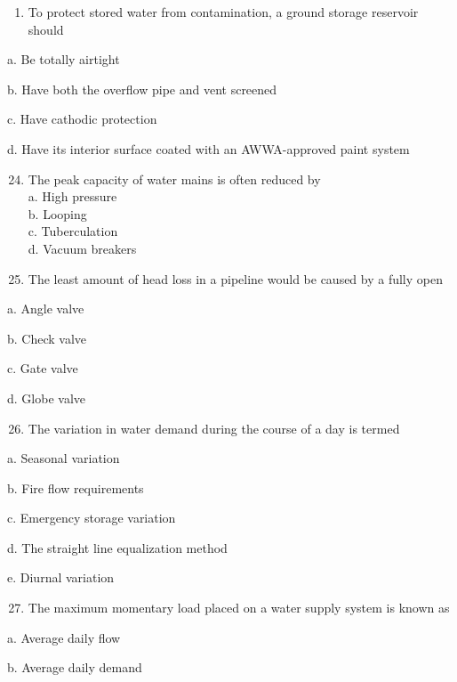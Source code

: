 \documentclass[10pt]{article}
\begin{document}
\begin{enumerate}
\begin{enumerate}
\begin{enumerate}
  \item To protect stored water from contamination, a ground storage reservoir should

\end{enumerate}

a. Be totally airtight

b. Have both the overflow pipe and vent screened

c. Have cathodic protection

d. Have its interior surface coated with an AWWA-approved paint system

\begin{enumerate}
  \setcounter{enumi}{23}
  \item The peak capacity of water mains is often reduced by\\
a. High pressure\\
b. Looping\\
c. Tuberculation\\
d. Vacuum breakers

  \item The least amount of head loss in a pipeline would be caused by a fully open

\end{enumerate}

a. Angle valve

b. Check valve

c. Gate valve

d. Globe valve

\begin{enumerate}
  \setcounter{enumi}{25}
  \item The variation in water demand during the course of a day is termed
\end{enumerate}

a. Seasonal variation

b. Fire flow requirements

c. Emergency storage variation

d. The straight line equalization method

e. Diurnal variation

\begin{enumerate}
  \setcounter{enumi}{26}
  \item The maximum momentary load placed on a water supply system is known as
\end{enumerate}

a. Average daily flow

b. Average daily demand


\end{enumerate}
\end{enumerate}
\end{document}
